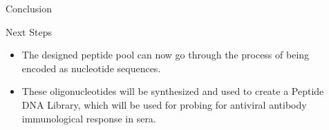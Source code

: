 \documentclass[final]{beamer}
\newlength{\sepwidth}
\newlength{\colwidth}
\newcommand{\separatorcolumn}{\begin{column}{\sepwidth}\end{column}}
\begin{document}
\begin{frame}[t]
\begin{columns}[t]
\begin{column}{\colwidth}
\begin{block}{Conclusion}
    \begin{block}{Next Steps}
      \begin{itemize}
      \item The designed peptide pool can now go through the process of being encoded as nucleotide sequences.
      \item These oligonucleotides will be synthesized and used to create a Peptide DNA Library, which
            will be used for probing for antiviral antibody immunological response in sera. 
      \end{itemize}
    \end{block}
  \end{block}
\end{column}

\separatorcolumn
\end{columns}
\end{frame}
\end{document}
